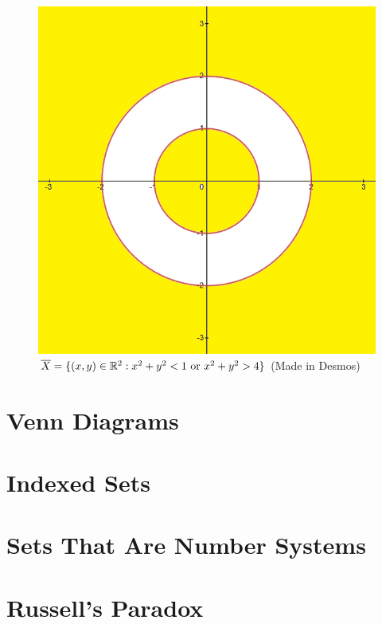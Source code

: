 \documentclass[../Latex-Setup/setup.tex]{subfiles}
\begin{document}
\begin{figure}[H]
\begin{minipage}{0.45\textwidth}
        \includegraphics[scale=0.45]{./images/Set-X-Complement.png}
        \caption{$\overline{X} = \{(x,y) \in \mathbb R^2 : x^2 + y^2 < 1 \text{ or } x^2 + y^2 > 4\}$ (Made in Desmos)}
    \end{minipage}
\end{figure}
\par

\section{Venn Diagrams}
\section{Indexed Sets}
\section{Sets That Are Number Systems}
\section{Russell's Paradox}
\end{document}
